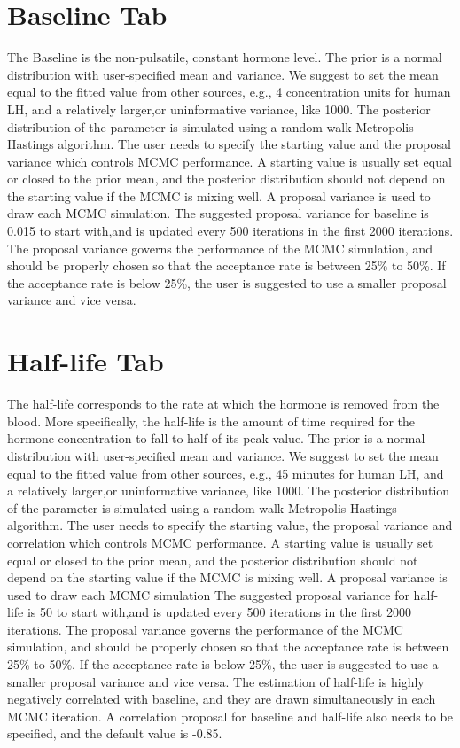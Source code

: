 \documentclass[11pt]{book}
\begin{document}
\section{Baseline Tab}\label{intro:p1}
The Baseline is the non-pulsatile, constant hormone level. The prior is a normal distribution with user-specified mean and variance. We suggest to set the mean equal to the fitted value from other sources, e.g., 4 concentration units for  human LH, and a relatively larger,or uninformative variance, like 1000. The posterior distribution of the parameter is simulated using a random walk Metropolis-Hastings algorithm. The user needs to specify the starting value and the proposal variance which controls MCMC performance. A starting value is usually set equal or closed to the prior mean, and the posterior distribution should not depend on the starting value if the MCMC is mixing well.  A proposal variance is used to draw each MCMC simulation. The suggested proposal variance for baseline is 0.015 to start with,and is updated every 500 iterations in the first 2000 iterations. The proposal variance governs the performance of the MCMC simulation, and should be properly chosen so that the acceptance rate is between 25\% to 50\%. If the acceptance rate is below 25\%, the user is suggested to use a smaller proposal variance and vice versa.
\section{Half-life Tab}
The half-life corresponds to the rate at which the hormone is removed from the blood. More specifically, the half-life is the amount of time required for the hormone concentration to fall to half of its peak value. The prior is a normal distribution with user-specified mean and variance. We suggest to set the mean equal to the fitted value from other sources, e.g., 45 minutes for  human LH, and a relatively larger,or uninformative variance, like 1000. The posterior distribution of the parameter is simulated using a random walk Metropolis-Hastings algorithm. The user needs to specify the starting value, the proposal variance and correlation which controls MCMC performance. A starting value is usually set equal or closed to the prior mean, and the posterior distribution should not depend on the starting value if the MCMC is mixing well. A proposal variance is used to draw each MCMC simulation The suggested proposal variance for half-life is 50 to start with,and is updated every 500 iterations in the first 2000 iterations. The proposal variance governs the performance of the MCMC simulation, and should be properly chosen so that the acceptance rate is between 25\% to 50\%. If the acceptance rate is below 25\%, the user is suggested to use a smaller proposal variance and vice versa. The estimation of half-life is highly negatively correlated with baseline, and they are drawn simultaneously in each MCMC iteration. A correlation proposal for baseline and half-life also needs to be specified, and the default value is -0.85.
\end{document}
